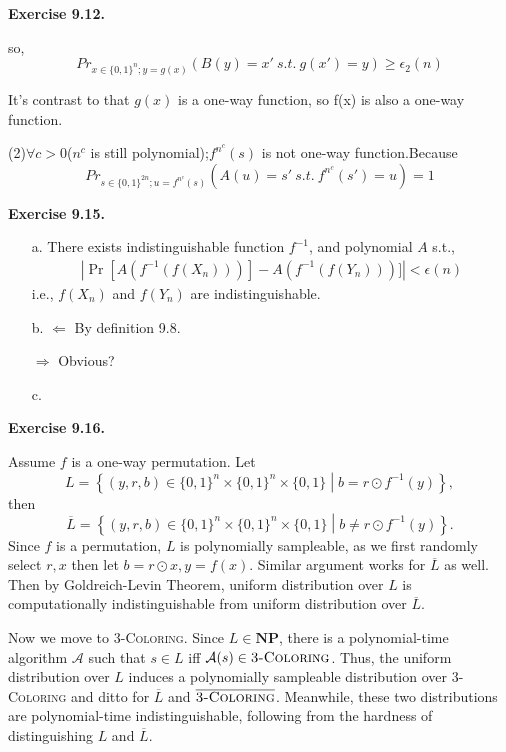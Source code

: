 \documentclass[a4paper]{article}
\newenvironment{exercise}[1]{
	\par
	\noindent\textbf{Exercise #1.}\quad
}{
	\par
	\bigskip
}
\newcommand{\cbra}[1]{\left\{ #1 \right\}}
\newcommand{\bin}{\{0,1\}}
\begin{document}
\begin{exercise}{9.12}
		so,
		\begin{equation}
		Pr_{x\in\{0,1\}^{n};y=g(x)}(B(y)=x'\ s.t.\ g(x')=y)\geq \epsilon_2(n)
		\end{equation}
		
		It's contrast to that $g(x)$ is a one-way function, so f(x) is also a one-way function.
		
		(2)$\forall c>0$($n^c$ is still polynomial);$f^{n^c}(s)$ is not one-way function.Because
		\begin{equation}
		Pr_{s\in\{0,1\}^{2n};u=f^{n^c}(s)}(A(u)=s' \ s.t.\  f^{n^c}(s')=u)=1
		\end{equation}
			
	\end{exercise}

	\begin{exercise}{9.15}
		\begin{itemize}
			\item [a.] 
				There exists indistinguishable function $f^{-1}$, and polynomial $A$ s.t.,
				\begin{align*}
					|\Pr[A(f^{-1}(f(X_{n})))] - A(f^{-1}(f(Y_{n})))]|<\epsilon(n)
				\end{align*}
				i.e., $f(X_{n})$ and $f(Y_{n})$ are indistinguishable.

			\item[b.] 
				$\Leftarrow$ By definition 9.8.

				$\Rightarrow$ Obvious?

			\item[c.] 

		\end{itemize}
	\end{exercise}

   \begin{exercise}{9.16}
       Assume $f$ is a one-way permutation.
       Let 
       $$
       L=\cbra{(y,r,b)\in\bin^n\times\bin^n\times\bin\middle|b=r\odot f^{-1}(y)},
       $$
       then
       $$
       \overline L=\cbra{(y,r,b)\in\bin^n\times\bin^n\times\bin\middle|b\neq r\odot f^{-1}(y)}.
       $$
       Since $f$ is a permutation, $L$ is polynomially sampleable, 
       as we first randomly select $r,x$ then let $b=r\odot x,y=f(x)$.
       Similar argument works for $\overline L$ as well.
       Then by Goldreich-Levin Theorem, uniform distribution over $L$ is computationally indistinguishable from 
       uniform distribution over $\overline L$.

       Now we move to \textsc{3-Coloring}. Since $L\in\textbf{NP}$, there is a polynomial-time algorithm $\mathcal A$
       such that $s\in L$ iff $\mathcal A(s)\in\textsc{3-Coloring}$.
       Thus, the uniform distribution over $L$ induces a polynomially sampleable distribution over \textsc{3-Coloring}
       and ditto for $\overline L$ and $\overline{\textsc{3-Coloring}}$.
       Meanwhile, these two distributions are polynomial-time indistinguishable, following from the hardness of 
       distinguishing $L$ and $\overline L$.

    \end{exercise}
\end{document}
